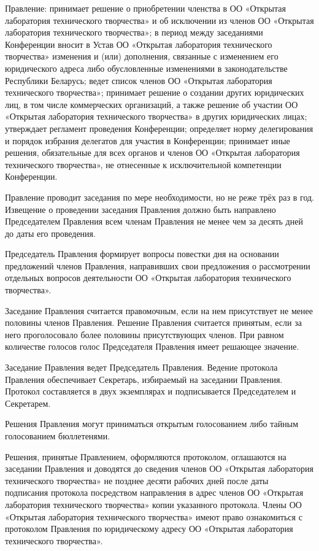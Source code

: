 \documentclass[a4paper,14pt,titlepage]{extarticle}
\begin{document}
Правление:
принимает решение о приобретении членства в ОО «Открытая лаборатория технического творчества» и об исключении из членов
ОО «Открытая лаборатория технического творчества»;
в период между заседаниями Конференции вносит в Устав ОО «Открытая лаборатория технического творчества» изменения и
(или) дополнения, связанные с изменением его юридического адреса либо обусловленные изменениями в законодательстве
Республики Беларусь;
ведет список членов ОО «Открытая лаборатория технического творчества»;
принимает решение о создании других юридических лиц, в том числе коммерческих организаций, а также решение об участии ОО
«Открытая лаборатория технического творчества» в других юридических лицах;
утверждает регламент проведения Конференции;
определяет норму делегирования и порядок избрания делегатов для участия в Конференции;
принимает иные решения, обязательные для всех органов и членов ОО «Открытая лаборатория технического творчества», не
отнесенные к исключительной компетенции Конференции.

Правление проводит заседания по мере необходимости, но не реже трёх раз в год. Извещение о проведении заседания
Правления должно быть направлено Председателем Правления всем членам Правления не менее чем за десять дней до даты его
проведения.

Председатель Правления формирует вопросы повестки дня на основании предложений членов Правления, направивших свои
предложения о рассмотрении отдельных вопросов деятельности ОО «Открытая лаборатория технического творчества».

Заседание Правления считается правомочным, если на нем присутствует не менее половины членов Правления. Решение
Правления считается принятым, если за него проголосовало более половины присутствующих членов. При равном количестве
голосов голос Председателя Правления имеет решающее значение.

Заседание Правления ведет Председатель Правления. Ведение протокола Правления обеспечивает Секретарь, избираемый на
заседании Правления. Протокол составляется в двух экземплярах и подписывается Председателем и Секретарем. 

Решения Правления могут приниматься открытым голосованием либо тайным голосованием бюллетенями.

Решения, принятые Правлением, оформляются протоколом, оглашаются на заседании Правления и доводятся до сведения членов
ОО «Открытая лаборатория технического творчества» не позднее десяти рабочих дней после даты подписания протокола
посредством направления в адрес членов ОО «Открытая лаборатория технического творчества» копии указанного протокола.
Члены ОО «Открытая лаборатория технического творчества» имеют право ознакомиться с протоколом Правления по юридическому
адресу ОО «Открытая лаборатория технического творчества».
\end{document}
